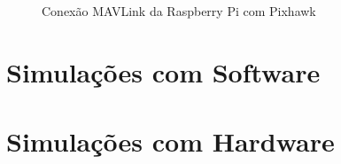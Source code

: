 \begin{figure}[htpb]
	\centering
	\caption{Conexão MAVLink da Raspberry Pi com Pixhawk}
	\fontsize{9pt}{12pt}\selectfont
	\color{black}
	\def\svgwidth{15cm}
	
	\label{fig:mavlink}
\end{figure}



\section{Simulações com Software}

\section{Simulações com Hardware}





